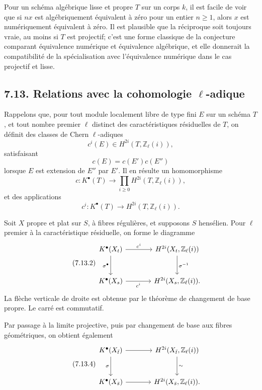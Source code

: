 \documentclass[11pt]{article}
\begin{document}
Pour un schéma algébrique lisse et propre \(T\) sur un corps \(k\), il est facile de voir que si \(nx\) est algébriquement équivalent à zéro pour un entier \(n\geq1\), alors \(x\) est numériquement équivalent à zéro. Il est plausible que la réciproque soit toujours vraie, au moins si \(T\) est projectif; c'est une forme classique de la conjecture comparant équivalence numérique et équivalence algébrique, et elle donnerait la compatibilité de la spécialisation avec l'équivalence numérique dans le cas projectif et lisse.

\subsection*{7.13. Relations avec la cohomologie \(\ell\)-adique}
Rappelons que, pour tout module localement libre de type fini \(E\) sur un schéma \(T\), et tout nombre premier \(\ell\) distinct des caractéristiques résiduelles de \(T\), on définit des classes de Chern \(\ell\)-adiques
\[
  c^i(E)\in H^{2i}(T,\mathbb Z_\ell(i)),
\]
satisfaisant
\[
  c(E)=c(E')c(E'')
\]
lorsque \(E\) est extension de \(E''\) par \(E'\). Il en résulte un homomorphisme
\begin{equation}\tag{7.13.0}
  c:K^\bullet(T)\longrightarrow
  \prod_{i\geq0}H^{2i}(T,\mathbb Z_\ell(i)),
\end{equation}
et des applications
\begin{equation}\tag{7.13.1}
  c^i:K^\bullet(T)\longrightarrow H^{2i}(T,\mathbb Z_\ell(i)).
\end{equation}

Soit \(X\) propre et plat sur \(S\), à fibres régulières, et supposons \(S\) hensélien. Pour \(\ell\) premier à la caractéristique résiduelle, on forme le diagramme
\begin{equation}\tag{7.13.2}
\begin{tikzcd}[column sep=large,row sep=large]
K^\bullet(X_t) \arrow[r,"c^i"] \arrow[d,"\sigma^\bullet"'] &
H^{2i}(X_t,\mathbb Z_\ell(i)) \arrow[d,"\sigma^{-1}"]\\
K^\bullet(X_s) \arrow[r,"c^i"'] &
H^{2i}(X_s,\mathbb Z_\ell(i)).
\end{tikzcd}
\end{equation}
La flèche verticale de droite est obtenue par le théorème de changement de base propre. Le carré est commutatif.

Par passage à la limite projective, puis par changement de base aux fibres géométriques, on obtient également
\begin{equation}\tag{7.13.4}
\begin{tikzcd}[column sep=large,row sep=large]
K^\bullet(X_{\bar t}) \arrow[r] \arrow[d,"\sigma"'] &
H^{2i}(X_{\bar t},\mathbb Z_\ell(i)) \arrow[d,"\sim"]\\
K^\bullet(X_{\bar s}) \arrow[r] &
H^{2i}(X_{\bar s},\mathbb Z_\ell(i)).
\end{tikzcd}
\end{equation}
\end{document}

